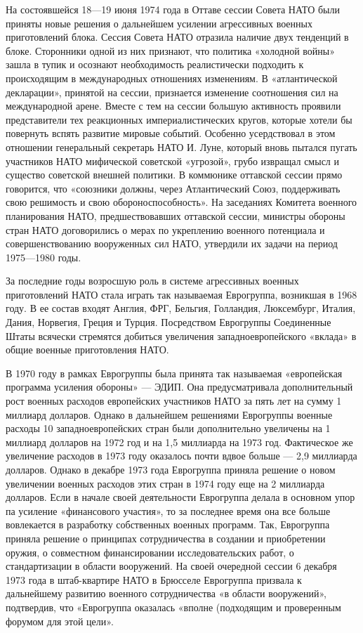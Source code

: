 \documentclass[12pt, a4paper, openany]{book}
\begin{document}
	На состоявшейся 18—19 июня 1974 года в Оттаве сессии Совета НАТО были приняты новые решения о дальнейшем усилении агрессивных военных приготовлений блока. Сессия Совета НАТО отразила наличие двух тенденций в блоке. Сторонники одной из них признают, что политика «холодной войны» зашла в тупик и осознают необходимость реалистически подходить к происходящим в международных отношениях изменениям. В «атлантической декларации», принятой на сессии, признается изменение соотношения сил на международной арене. Вместе с тем на сессии большую активность проявили представители тех реакционных империалистических кругов, которые хотели бы повернуть вспять развитие мировые событий. Особенно усердствовал в этом отношении генеральный секретарь НАТО И. Луне, который вновь пытался пугать участников НАТО мифической советской «угрозой», грубо извращал смысл и существо советской внешней политики. В коммюнике оттавской сессии прямо говорится, что «союзники должны, через Атлантический Союз, поддерживать свою решимость и свою обороноспособность». На заседаниях Комитета военного планирования НАТО, предшествовавших оттавской сессии, министры обороны стран НАТО договорились о мерах по укреплению военного потенциала и совершенствованию вооруженных сил НАТО, утвердили их задачи на период 1975—1980 годы.
	
	За последние годы возросшую роль в системе агрессивных военных приготовлений НАТО стала играть так называемая Еврогруппа, возникшая в 1968 году. В ее состав входят Англия, ФРГ, Бельгия, Голландия, Люксембург, Италия, Дания, Норвегия, Греция и Турция. Посредством Еврогруппы Соединенные Штаты всячески стремятся добиться увеличения западноевропейского «вклада» в общие военные приготовления НАТО.
	
	В 1970 году в рамках Еврогруппы была принята так называемая «европейская программа усиления обороны» — ЭДИП. Она предусматривала дополнительный рост военных расходов европейских участников НАТО за пять лет на сумму 1 миллиард долларов. Однако в дальнейшем решениями Еврогруппы военные расходы 10 западноевропейских стран были дополнительно увеличены на 1 миллиард долларов на 1972 год и на 1,5 миллиарда на 1973 год. Фактическое же увеличение расходов в 1973 году оказалось почти вдвое больше — 2,9 миллиарда долларов. Однако в декабре 1973 года Еврогруппа приняла решение о новом увеличении военных расходов этих стран в 1974 году еще на 2 миллиарда долларов. Если в начале своей деятельности Еврогруппа делала в основном упор па усиление «финансового участия», то за последнее время она все больше вовлекается в разработку собственных военных программ. Так, Еврогруппа приняла решение о принципах сотрудничества в создании и приобретении оружия, о совместном финансировании исследовательских работ, о стандартизации в области вооружений. На своей очередной сессии 6 декабря 1973 года в штаб-квартире НАТО в Брюсселе Еврогруппа призвала к дальнейшему развитию военного сотрудничества «в области вооружений», подтвердив, что «Еврогруппа оказалась «вполне (подходящим и проверенным форумом для этой цели».
	
\end{document}
